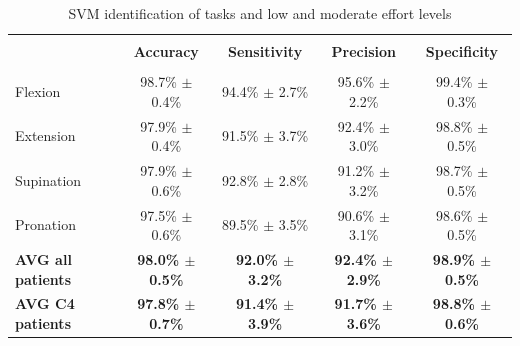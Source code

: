 \begin{table}[]
\centering
\caption{SVM identification of tasks and low and moderate effort levels}
\label{tb:2-8}
\begin{tabular}{lcccc}
 & & & &\\
                          & \textbf{Accuracy}           & \textbf{Sensitivity}        & \textbf{Precision}          & \textbf{Specificity}        \\ \hline
                          &                             &                             &                             &                             \\
Flexion                   & 98.7\% $\pm$ 0.4\%          & 94.4\% $\pm$ 2.7\%          & 95.6\% $\pm$ 2.2\%          & 99.4\% $\pm$ 0.3\%          \\
Extension                 & 97.9\% $\pm$ 0.4\%          & 91.5\% $\pm$ 3.7\%          & 92.4\% $\pm$ 3.0\%          & 98.8\% $\pm$ 0.5\%          \\
Supination                & 97.9\% $\pm$ 0.6\%          & 92.8\% $\pm$ 2.8\%          & 91.2\% $\pm$ 3.2\%          & 98.7\% $\pm$ 0.5\%          \\
Pronation                 & 97.5\% $\pm$ 0.6\%          & 89.5\% $\pm$ 3.5\%          & 90.6\% $\pm$ 3.1\%          & 98.6\% $\pm$ 0.5\%          \\ \hline \hline
\textbf{AVG all patients} & \textbf{98.0\% $\pm$ 0.5\%} & \textbf{92.0\% $\pm$ 3.2\%} & \textbf{92.4\% $\pm$ 2.9\%} & \textbf{98.9\% $\pm$ 0.5\%} \\
\textbf{AVG C4 patients}  & \textbf{97.8\% $\pm$ 0.7\%} & \textbf{91.4\% $\pm$ 3.9\%} & \textbf{91.7\% $\pm$ 3.6\%} & \textbf{98.8\% $\pm$ 0.6\%}
\end{tabular}
\end{table}

